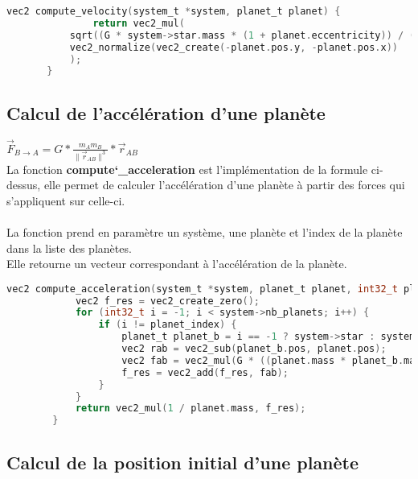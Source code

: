 \documentclass[a4paper,10pt]{article}
\begin{document}
    \begin{lstlisting}[language=c,label={lst:lstlisting3}]
        vec2 compute_velocity(system_t *system, planet_t planet) {
               return vec2_mul(
           sqrt((G * system->star.mass * (1 + planet.eccentricity)) / (planet.semi_major_axis * (1 - planet.eccentricity))),
           vec2_normalize(vec2_create(-planet.pos.y, -planet.pos.x))
           );
       }
    \end{lstlisting}
    
    \subsection{Calcul de l'accélération d'une planète}\label{subsec:calcul-de-l'accélération-d'une-planète}

    $\vec{F}_{B\to{}A} = G * \frac{m_{A}m_{B}}{\|\vec{r}_{AB}\|^{3}} * \vec{r}_{AB}$\\
    
    La fonction \textbf{compute\char`_acceleration} est l'implémentation de la formule ci-dessus, elle permet de calculer l'accélération d'une planète à partir des forces qui s'appliquent sur celle-ci. \\\\
    La fonction prend en paramètre un système, une planète et l'index de la planète dans la liste des planètes.\\
    Elle retourne un vecteur correspondant à l'accélération de la planète.

    \begin{lstlisting}[language=c,label={lst:lstlisting4}]
        vec2 compute_acceleration(system_t *system, planet_t planet, int32_t planet_index) {
            vec2 f_res = vec2_create_zero();
            for (int32_t i = -1; i < system->nb_planets; i++) {
                if (i != planet_index) {
                    planet_t planet_b = i == -1 ? system->star : system->planets[i];
                    vec2 rab = vec2_sub(planet_b.pos, planet.pos);
                    vec2 fab = vec2_mul(G * ((planet.mass * planet_b.mass) / pow(vec2_norm(rab), 3)), rab);
                    f_res = vec2_add(f_res, fab);
                }
            }
            return vec2_mul(1 / planet.mass, f_res);
        }
    \end{lstlisting}
    
    \subsection{Calcul de la position initial d'une planète}\label{subsec:calcul-de-la-position-initial-d'une-planète}
\end{document}
